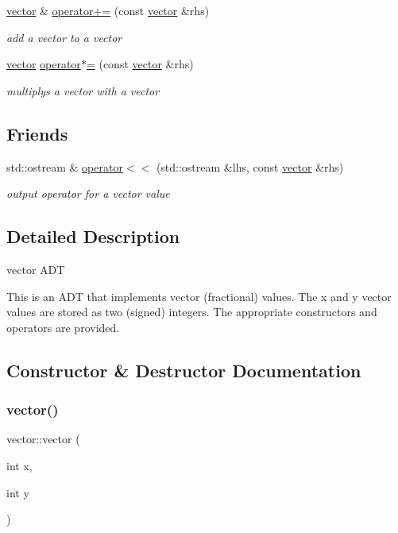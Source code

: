 \begin{DoxyCompactItemize}
\hyperlink{classvector}{vector} \& \hyperlink{classvector_acf4c6a4d343c92e211f80de7712a3cac}{operator+=} (const \hyperlink{classvector}{vector} \&rhs)
\begin{DoxyCompactList}\small\item\em add a vector to a vector \end{DoxyCompactList}\item 
\hyperlink{classvector}{vector} \hyperlink{classvector_a182c6b1bb87ac682b95f0ee848c0221b}{operator$\ast$=} (const \hyperlink{classvector}{vector} \&rhs)
\begin{DoxyCompactList}\small\item\em multiplys a vector with a vector \end{DoxyCompactList}\end{DoxyCompactItemize}
\subsection*{Friends}
\begin{DoxyCompactItemize}
\item 
std\+::ostream \& \hyperlink{classvector_a7a6813f75dabd6f9575f9d6f91890255}{operator$<$$<$} (std\+::ostream \&lhs, const \hyperlink{classvector}{vector} \&rhs)
\begin{DoxyCompactList}\small\item\em output operator for a vector value \end{DoxyCompactList}\end{DoxyCompactItemize}


\subsection{Detailed Description}
vector A\+DT 

This is an A\+DT that implements vector (fractional) values. The x and y vector values are stored as two (signed) integers. The appropriate constructors and operators are provided. 

\subsection{Constructor \& Destructor Documentation}
\mbox{\label{classvector_a7fa147d3199381b9d8b32753bd1a6968}} 
\subsubsection{\texorpdfstring{vector()}{vector()}}
{\footnotesize\ttfamily vector\+::vector (\begin{DoxyParamCaption}\item[{int}]{x,  }\item[{int}]{y }\end{DoxyParamCaption})\hspace{0.3cm}{\ttfamily [inline]}}



